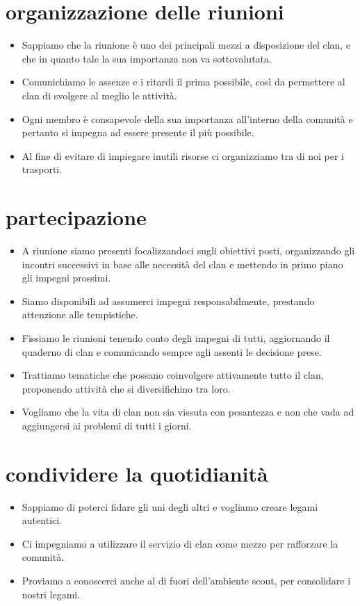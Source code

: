 \documentclass[12pt]{report}
\begin{document}
		\section*{organizzazione delle riunioni}
		\begin{itemize}
			\item Sappiamo che la riunione è uno dei principali mezzi a 
			disposizione del clan, e che in quanto tale la sua importanza 
			non va sottovalutata.
			\item Comunichiamo le assenze e i ritardi il prima possibile, 
			così da permettere al clan di svolgere al meglio le attività. 
			\item Ogni membro è consapevole della sua importanza all'interno 
			della comunità e pertanto si impegna ad essere presente 
			il più possibile.
			\item Al fine di evitare di impiegare inutili risorse ci
			organizziamo tra di noi per i trasporti.
		\end{itemize}
		
		\section*{partecipazione}
		\begin{itemize}
			\item A riunione siamo presenti focalizzandoci sugli obiettivi
			posti, organizzando gli incontri successivi in base alle 
			necessità del clan e mettendo in primo piano gli impegni prossimi.
			\item Siamo disponibili ad assumerci impegni responsabilmente, 
			prestando attenzione alle tempistiche.
			\item Fissiamo le riunioni tenendo conto degli impegni di tutti, 
			aggiornando il quaderno di clan e comunicando sempre agli assenti 
			le decisione prese.
			\item Trattiamo tematiche che possano coinvolgere attivamente tutto 
			il clan, proponendo attività che si diversifichino tra loro.
			\item Vogliamo che la vita di clan non sia vissuta con pesantezza e 
			non che vada ad aggiungersi ai problemi di tutti i giorni.
		\end{itemize}
		
		\section*{condividere la quotidianità}
		\begin{itemize}
			\item Sappiamo di poterci fidare gli uni degli altri e vogliamo 
			creare legami autentici.
			\item Ci impegniamo a utilizzare il servizio di clan come mezzo per 
			rafforzare la comunità.
			\item Proviamo a conoscerci anche al di fuori dell’ambiente scout, 
			per consolidare i nostri legami.
		\end{itemize}
		
\end{document}

